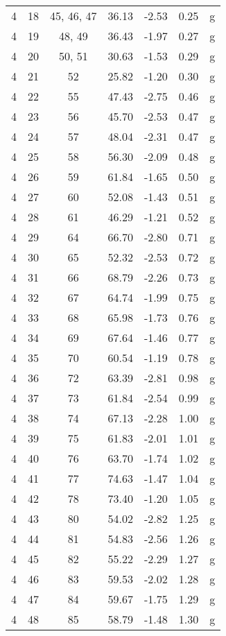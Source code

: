 \begin{center}
\begin{longtable}{cccrrrc}
  4 & 18 & 45, 46, 47 & 36.13 & -2.53 &  0.25 & g\\
  4 & 19 & 48, 49 & 36.43 & -1.97 &  0.27 & g\\
  4 & 20 & 50, 51 & 30.63 & -1.53 &  0.29 & g\\
  4 & 21 & 52 & 25.82 & -1.20 &  0.30 & g\\
  4 & 22 & 55 & 47.43 & -2.75 &  0.46 & g\\
  4 & 23 & 56 & 45.70 & -2.53 &  0.47 & g\\
  4 & 24 & 57 & 48.04 & -2.31 &  0.47 & g\\
  4 & 25 & 58 & 56.30 & -2.09 &  0.48 & g\\
  4 & 26 & 59 & 61.84 & -1.65 &  0.50 & g\\
  4 & 27 & 60 & 52.08 & -1.43 &  0.51 & g\\
  4 & 28 & 61 & 46.29 & -1.21 &  0.52 & g\\
  4 & 29 & 64 & 66.70 & -2.80 &  0.71 & g\\
  4 & 30 & 65 & 52.32 & -2.53 &  0.72 & g\\
  4 & 31 & 66 & 68.79 & -2.26 &  0.73 & g\\
  4 & 32 & 67 & 64.74 & -1.99 &  0.75 & g\\
  4 & 33 & 68 & 65.98 & -1.73 &  0.76 & g\\
  4 & 34 & 69 & 67.64 & -1.46 &  0.77 & g\\
  4 & 35 & 70 & 60.54 & -1.19 &  0.78 & g\\
  4 & 36 & 72 & 63.39 & -2.81 &  0.98 & g\\
  4 & 37 & 73 & 61.84 & -2.54 &  0.99 & g\\
  4 & 38 & 74 & 67.13 & -2.28 &  1.00 & g\\
  4 & 39 & 75 & 61.83 & -2.01 &  1.01 & g\\
  4 & 40 & 76 & 63.70 & -1.74 &  1.02 & g\\
  4 & 41 & 77 & 74.63 & -1.47 &  1.04 & g\\
  4 & 42 & 78 & 73.40 & -1.20 &  1.05 & g\\
  4 & 43 & 80 & 54.02 & -2.82 &  1.25 & g\\
  4 & 44 & 81 & 54.83 & -2.56 &  1.26 & g\\
  4 & 45 & 82 & 55.22 & -2.29 &  1.27 & g\\
  4 & 46 & 83 & 59.53 & -2.02 &  1.28 & g\\
  4 & 47 & 84 & 59.67 & -1.75 &  1.29 & g\\
  4 & 48 & 85 & 58.79 & -1.48 &  1.30 & g\\

\end{longtable}
\end{center}
